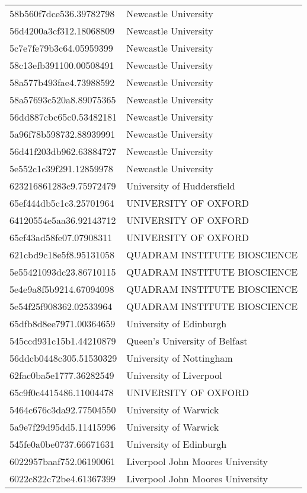 \begin{tabular}{ll}
58b560f7dce536.39782798 & Newcastle University \\
56d4200a3cf312.18068809 & Newcastle University \\
5c7e7fe79b3c64.05959399 & Newcastle University \\
58c13efb391100.00508491 & Newcastle University \\
58a577b493fae4.73988592 & Newcastle University \\
58a57693c520a8.89075365 & Newcastle University \\
56dd887cbc65c0.53482181 & Newcastle University \\
5a96f78b598732.88939991 & Newcastle University \\
56d41f203db962.63884727 & Newcastle University \\
5e552c1c39f291.12859978 & Newcastle University \\
623216861283c9.75972479 & University of Huddersfield \\
65ef444db5c1c3.25701964 & UNIVERSITY OF OXFORD \\
64120554e5aa36.92143712 & UNIVERSITY OF OXFORD \\
65ef43ad58fe07.07908311 & UNIVERSITY OF OXFORD \\
621cbd9c18e5f8.95131058 & QUADRAM INSTITUTE BIOSCIENCE \\
5e55421093dc23.86710115 & QUADRAM INSTITUTE BIOSCIENCE \\
5e4e9a8f5b9214.67094098 & QUADRAM INSTITUTE BIOSCIENCE \\
5e54f25f908362.02533964 & QUADRAM INSTITUTE BIOSCIENCE \\
65dfb8d8ee7971.00364659 & University of Edinburgh \\
545ccd931c15b1.44210879 & Queen's University of Belfast \\
56ddcb0448c305.51530329 & University of Nottingham \\
62fac0ba5e1777.36282549 & University of Liverpool \\
65c9f0c4415486.11004478 & UNIVERSITY OF OXFORD \\
5464c676c3da92.77504550 & University of Warwick \\
5a9e7f29d95dd5.11415996 & University of Warwick \\
545fe0a0be0737.66671631 & University of Edinburgh \\
6022957baaf752.06190061 & Liverpool John Moores University \\
6022c822c72be4.61367399 & Liverpool John Moores University \\

\end{tabular}

